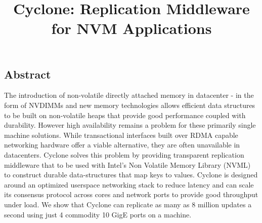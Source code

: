 \documentclass[letterpaper,twocolumn,10pt]{article}
\begin{document}
\date{}

\title{\Large \bf Cyclone: Replication Middleware for NVM Applications}


\maketitle


\subsection*{Abstract}
The introduction of non-volatile directly attached memory in datacenter - in
the form of NVDIMMs and new memory technologies allows efficient data structures
to be built on non-volatile heaps that provide good performance coupled with
durability. However high availability remains a problem for these primarily
single machine solutions. While transactional interfaces built over RDMA
capable networking hardware offer a viable alternative, they are often
unavailable in datacenters. Cyclone solves this problem by providing transparent
replication middleware that to be used with Intel's Non Volatile Memory Library 
(NVML) to construct durable data-structures that map keys to values.
Cyclone is designed around an optimized userspace networking stack to reduce
latency and can scale its consensus protocol across cores and network ports to
provide good throughput under load. We show that Cyclone can replicate as many
as 8 million updates a second using just 4 commodity 10 GigE ports on a machine.
\end{document}
